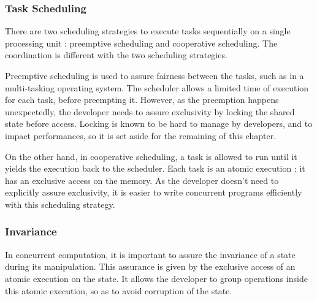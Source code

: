 \subsubsection{Task Scheduling}

There are two scheduling strategies to execute tasks sequentially on a single processing unit : preemptive scheduling and cooperative scheduling.
The coordination is different with the two scheduling strategies.


Preemptive scheduling is used to assure fairness between the tasks, such as in a multi-tasking operating system.
The scheduler allows a limited time of execution for each task, before preempting it.
However, as the preemption happens unexpectedly, the developer needs to assure exclusivity by locking the shared state before access.
Locking is known to be hard to manage by developers, and to impact performances, so it is set aside for the remaining of this chapter.

On the other hand, in cooperative scheduling, a task is allowed to run until it yields the execution back to the scheduler.
Each task is an atomic execution : it has an exclusive access on the memory.
As the developer doesn't need to explicitly assure exclusivity, it is easier to write concurrent programs efficiently with this scheduling strategy.

\subsubsection{Invariance}

In concurrent computation, it is important to assure the invariance of a state during its manipulation.
This assurance is given by the exclusive access of an atomic execution on the state.
It allows the developer to group operations inside this atomic execution, so as to avoid corruption of the state.

